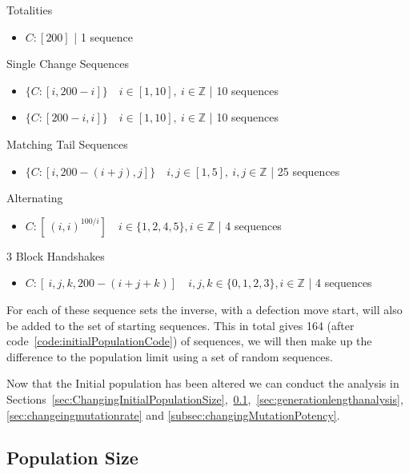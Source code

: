 Totalities
\begin{itemize}
    \item \(C:[200]\) | 1 sequence
\end{itemize}

Single Change Sequences
\begin{itemize}
    \item \(\{C:[i,200-i]\} \quad i\in [1,10],\ i \in \mathbb{Z}\) | 10 sequences
    \item \(\{C:[200-i,i]\} \quad i\in [1,10],\ i \in \mathbb{Z}\) | 10 sequences
\end{itemize}

Matching Tail Sequences
\begin{itemize}
    \item \(\{C:[i,200-(i+j),j]\} \quad i,j \in [1,5],\ i,j \in \mathbb{Z}\) | 25 sequences
\end{itemize}

Alternating
\begin{itemize}
    \item \(C:[\ (i,i)^{100/i}] \quad i \in \{1,2,4,5\}, i \in \mathbb{Z}\) | 4 sequences
\end{itemize}

3 Block Handshakes
\begin{itemize}
    \item \(C:[\ i,j,k,200-(i+j+k)] \quad i,j,k \in \{0,1,2,3\}, i \in \mathbb{Z}\) | 4 sequences
\end{itemize}

For each of these sequence sets the inverse, with a defection move start, will also be added to the set of starting sequences.
This in total gives 164 (after code~\ref{code:initialPopulationCode}) of sequences, we will then make up the difference to the population limit using a set of random sequences.

Now that the Initial population has been altered we can conduct the analysis in Sections~\ref{sec:ChangingInitialPopulationSize},~\ref{subsec:populationSize},~\ref{sec:generationlengthanalysis},~\ref{sec:changeingmutationrate} and \ref{subsec:changingMutationPotency}.

\subsection{Population Size}\label{subsec:populationSize}

